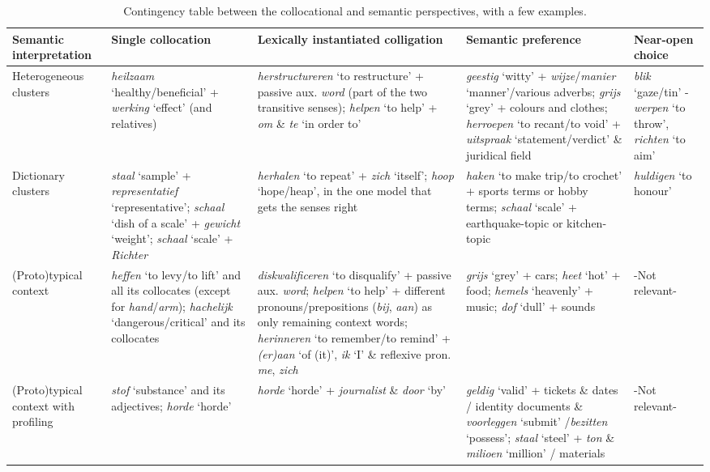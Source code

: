 \documentclass[
]{book}
\begin{document}
\begin{landscape}\begin{table}

\caption{\label{tab:colsem}Contingency table between the collocational and semantic perspectives, with a few examples.}
\centering
\fontsize{8}{10}\selectfont
\begin{tabu} to 
\toprule
Semantic interpretation & Single collocation & Lexically instantiated colligation & Semantic preference & Near-open choice\\
\midrule
Heterogeneous clusters & \textit{heilzaam} `healthy/beneficial' + \textit{werking} `effect' (and relatives) & \textit{herstructureren} `to restructure' + passive aux. \textit{word} (part of the two transitive senses); \textit{helpen} `to help' + \textit{om} \& \textit{te} `in order to' & \textit{geestig} `witty' + \textit{wijze}/\textit{manier} `manner'/various adverbs; \textit{grijs} `grey' + colours and clothes; \textit{herroepen} `to recant/to void' + \textit{uitspraak} `statement/verdict' \& juridical field & \textit{blik} `gaze/tin' - \textit{werpen} `to throw', \textit{richten} `to aim'\\
\addlinespace
Dictionary clusters & \textit{staal} `sample' + \textit{representatief} `representative'; \textit{schaal} `dish of a scale' + \textit{gewicht} `weight'; \textit{schaal} `scale' + \textit{Richter} & \textit{herhalen} `to repeat' + \textit{zich} `itself'; \textit{hoop} `hope/heap', in the one model that gets the senses right & \textit{haken} `to make trip/to crochet' + sports terms or hobby terms; \textit{schaal} `scale' + earthquake-topic or kitchen-topic & \textit{huldigen} `to honour'\\
\addlinespace
(Proto)typical context & \textit{heffen} `to levy/to lift' and all its collocates (except for \textit{hand}/\textit{arm}); \textit{hachelijk} `dangerous/critical' and its collocates & \textit{diskwalificeren} `to disqualify' + passive aux. \textit{word}; \textit{helpen} `to help' + different pronouns/prepositions (\textit{bij}, \textit{aan}) as only remaining context words; \textit{herinneren} `to remember/to remind' + \textit{(er)aan} `of (it)', \textit{ik} `I' \& reflexive pron. \textit{me}, \textit{zich} & \textit{grijs} `grey' + cars; \textit{heet} `hot' + food; \textit{hemels} `heavenly' + music; \textit{dof} `dull' + sounds & -Not relevant-\\
\addlinespace
(Proto)typical context with profiling & \textit{stof} `substance' and its adjectives; \textit{horde} `horde' & \textit{horde} `horde' + \textit{journalist} \& \textit{door} `by' & \textit{geldig} `valid' + tickets \& dates / identity documents \& \textit{voorleggen} `submit' /\textit{bezitten} `possess'; \textit{staal} `steel' + \textit{ton} \& \textit{milioen} `million' / materials & -Not relevant-\\
\bottomrule
\end{tabu}
\end{table}
\end{landscape}
\end{document}
